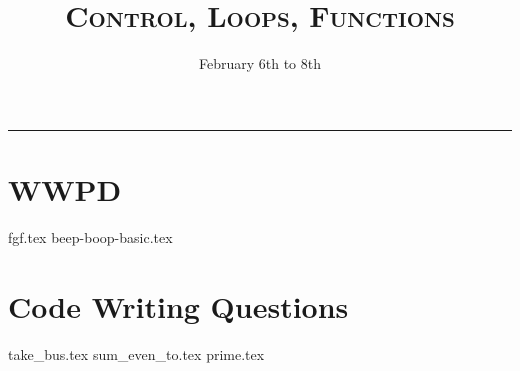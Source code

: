 \documentclass{exam}
\title{\textsc{Control, Loops, Functions}}
\date{February 6th to 8th}
\begin{document}
\maketitle
\rule{\textwidth}{0.15em}
\fontsize{12}{15}\selectfont


\section{WWPD}
\begin{questions}
{fgf.tex}
\newpage
{beep-boop-basic.tex}
\end{questions}

\newpage
\section{Code Writing Questions}
\begin{questions}
{take_bus.tex}
{sum_even_to.tex}
\newpage
{prime.tex}

\end{questions}
\end{document}
